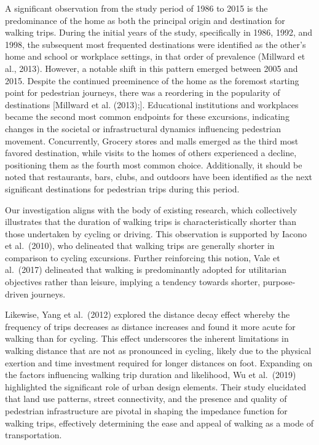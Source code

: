 \documentclass[12pt,twoside]{reedthesis}
\begin{document}
A significant observation from the study period of 1986 to 2015 is the predominance of the home as both the principal origin and destination for walking trips. During the initial years of the study, specifically in 1986, 1992, and 1998, the subsequent most frequented destinations were identified as the other's home and school or workplace settings, in that order of prevalence (Millward et al., 2013). However, a notable shift in this pattern emerged between 2005 and 2015. Despite the continued preeminence of the home as the foremost starting point for pedestrian journeys, there was a reordering in the popularity of destinations {[}Millward et al. (2013);{]}. Educational institutions and workplaces became the second most common endpoints for these excursions, indicating changes in the societal or infrastructural dynamics influencing pedestrian movement. Concurrently, Grocery stores and malls emerged as the third most favored destination, while visits to the homes of others experienced a decline, positioning them as the fourth most common choice. Additionally, it should be noted that restaurants, bars, clubs, and outdoors have been identified as the next significant destinations for pedestrian trips during this period.

Our investigation aligns with the body of existing research, which collectively illustrates that the duration of walking trips is characteristically shorter than those undertaken by cycling or driving. This observation is supported by Iacono et al.~(2010), who delineated that walking trips are generally shorter in comparison to cycling excursions. Further reinforcing this notion, Vale et al.~(2017) delineated that walking is predominantly adopted for utilitarian objectives rather than leisure, implying a tendency towards shorter, purpose-driven journeys.

Likewise, Yang et al.~(2012) explored the distance decay effect whereby the frequency of trips decreases as distance increases and found it more acute for walking than for cycling. This effect underscores the inherent limitations in walking distance that are not as pronounced in cycling, likely due to the physical exertion and time investment required for longer distances on foot. Expanding on the factors influencing walking trip duration and likelihood, Wu et al.~(2019) highlighted the significant role of urban design elements. Their study elucidated that land use patterns, street connectivity, and the presence and quality of pedestrian infrastructure are pivotal in shaping the impedance function for walking trips, effectively determining the ease and appeal of walking as a mode of transportation.
\end{document}
